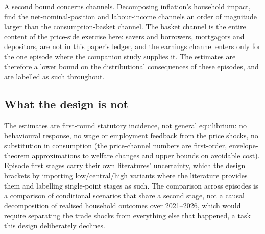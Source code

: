 A second bound concerns channels. Decomposing inflation's household
impact, \citet{ferreira2026} find the net-nominal-position and
labour-income channels an order of magnitude larger than the
consumption-basket channel. The basket channel is the entire content
of the price-side exercise here: savers and borrowers, mortgagors and
depositors, are not in this paper's ledger, and the earnings channel
enters only for the one episode where the companion study supplies it.
The estimates are therefore a lower bound on the distributional
consequences of these episodes, and are labelled as such throughout.

\subsection{What the design is not}

The estimates are first-round statutory incidence, not general
equilibrium: no behavioural response, no wage or employment feedback
from the price shocks, no substitution in consumption (the price-channel
numbers are first-order, envelope-theorem approximations to welfare
changes and upper bounds on avoidable cost). Episode first stages carry
their own literatures' uncertainty, which the design brackets by
importing low/central/high variants where the literature provides them
and labelling single-point stages as such. The comparison across
episodes is a comparison of conditional scenarios that share a second
stage, not a causal decomposition of realised household outcomes over
2021--2026, which would require separating the trade shocks from
everything else that happened, a task this design deliberately
declines.
